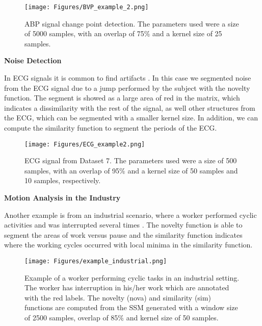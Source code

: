 \begin{figure}
    \centering
    \texttt{[image: Figures/BVP\_example\_2.png]}
    \caption{ABP signal change point detection. The parameters used were a size of 5000 samples, with an overlap of 75\% and a kernel size of 25 samples.}
    \label{fig:example3}
\end{figure}

\vspace{5mm}

{\normalsize \textbf{Noise Detection}}\\
\par

In ECG signals it is common to find artifacts \cite{dataset6}. In this case we segmented noise from the ECG signal due to a jump performed by the subject with the novelty function. The segment is showed as a large area of red in the matrix, which indicates a dissimilarity with the rest of the signal, as well other structures from the ECG, which can be segmented with a smaller kernel size. In addition, we can compute the similarity function to segment the periods of the ECG.

\begin{figure}
    \centering
    \texttt{[image: Figures/ECG\_example2.png]}
    \caption{ECG signal from Dataset 7. The parameters used were a size of 500 samples, with an overlap of 95\% and a kernel size of 50 samples and 10 samples, respectively.}
    \label{fig:example3}
\end{figure}



{\normalsize \textbf{Motion Analysis in the Industry}}\\
\par

Another example is from an industrial scenario, where a worker performed cyclic activities and was interrupted several times \cite{antonio, santos_explaining_2020}. The novelty function is able to segment the areas of work versus pause and the similarity function indicates where the working cycles occurred with local minima in the similarity function.

\begin{figure}
    \centering
    \texttt{[image: Figures/example\_industrial.png]}
    \caption{Example of a worker performing cyclic tasks in an industrial setting. The worker has interruption in his/her work which are annotated with the red labels. The novelty (nova) and similarity (sim) functions are computed from the \gls{SSM} generated with a window size of 2500 samples, overlap of 85\% and kernel size of 50 samples.}
    \label{fig:my_label}
\end{figure}


